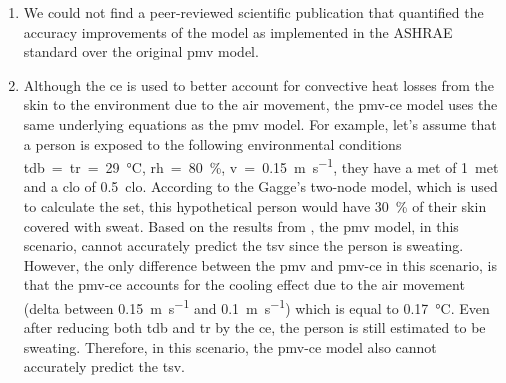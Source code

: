 \begin{enumerate}
    \item We could not find a peer-reviewed scientific publication that quantified the accuracy improvements of the model as implemented in the ASHRAE standard over the original \ac{pmv} model.
    \item Although the \ac{ce} is used to better account for convective heat losses from the skin to the environment due to the air movement, the \ac{pmv-ce} model uses the same underlying equations as the \ac{pmv} model.
    For example, let's assume that a person is exposed to the following environmental conditions \ac{tdb}~=~\ac{tr}~=~\qty{29}{\celsius}, \ac{rh}~=~\qty{80}{\percent}, \ac{v}~=~\qty{0.15}{\m\per\s}, they have a \ac{met} of \qty{1}{met} and a \ac{clo} of \qty{0.5}{clo}.
    According to the Gagge's two-node model, which is used to calculate the \ac{set}, this hypothetical person would have \qty{30}{\percent} of their skin covered with sweat.
    Based on the results from , the \ac{pmv} model, in this scenario, cannot accurately predict the \ac{tsv} since the person is sweating.
    However, the only difference between the \ac{pmv} and \ac{pmv-ce} in this scenario, is that the \ac{pmv-ce} accounts for the cooling effect due to the air movement (delta between \qty{0.15}{\m\per\s} and \qty{0.1}{\m\per\s}) which is equal to \qty{.17}{\celsius}.
    Even after reducing both \ac{tdb} and \ac{tr} by the \ac{ce}, the person is still estimated to be sweating.
    Therefore, in this scenario, the \ac{pmv-ce} model also cannot accurately predict the \ac{tsv}.

\end{enumerate}
